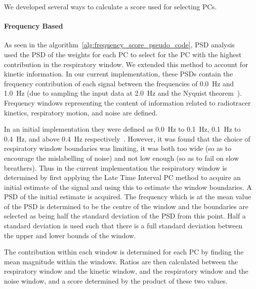             We developed several ways to calculate a score used for selecting \glspl{PC}.
            
            \paragraph{Frequency Based} \label{sec:frequency_based}
                As seen in the algorithm~\ref{alg:frequency_score_pseudo_code}, \gls{PSD} analysis~\parencite{Thielemans2011} used the \gls{PSD} of the weights for each \gls{PC} to select for the \gls{PC} with the highest contribution in the respiratory window. We extended this method to account for kinetic information. In our current implementation, these \glspl{PSD} contain the frequency contribution of each signal between the frequencies of \SI{0.0}{\hertz} and \SI{1.0}{\hertz} (due to sampling the input data at \SI{2.0}{\hertz} and the Nyquist theorem~\parencite{Whittaker1915OnInterpolation-Theory, Nyquist1928CertainTheory, Shannon1949CommunicationNoise}). Frequency windows representing the content of information related to radiotracer kinetics, respiratory motion, and noise are defined.
                
                In an initial implementation they were defined as \SI{0.0}{\hertz} to \SI{0.1}{\hertz}, \SI{0.1}{\hertz} to \SI{0.4}{\hertz}, and above \SI{0.4}{\hertz} respectively~\parencite{Bertolli2017}. However, it was found that the choice of respiratory window boundaries was limiting, it was both too wide (so as to encourage the mislabelling of noise) and not low enough (so as to fail on slow breathers). Thus in the current implementation the respiratory window is determined by first applying the Late Time Interval \gls{PC} method to acquire an initial estimate of the signal and using this to estimate the window boundaries. A \gls{PSD} of the initial estimate is acquired. The frequency which is at the mean value of the \gls{PSD} is determined to be the centre of the window and the boundaries are selected as being half the standard deviation of the \gls{PSD} from this point. Half a standard deviation is used such that there is a full standard deviation between the upper and lower bounds of the window.
                
                The contribution within each window is determined for each \gls{PC} by finding the mean magnitude within the windows. Ratios are then calculated between the respiratory window and the kinetic window, and the respiratory window and the noise window, and a score determined by the product of these two values.
                    
